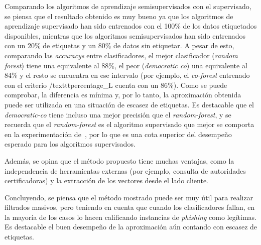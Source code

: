 Comparando los algoritmos de aprendizaje semisupervisados con el supervisado, se piensa que el resultado obtenido es muy bueno ya que los algoritmos de aprendizaje supervisado han sido entrenados con el 100\% de los datos etiquetados disponibles, mientras que los algoritmos semisupervisados han sido entrenados con un 20\% de etiquetas y un 80\% de datos sin etiquetar. A pesar de esto, comparando las \textit{accuracys} entre clasificadores, el mejor clasificador (\textit{random forest}) tiene una equivalente al 88\%, el peor (\textit{democratic co}) una equivalente al 84\% y el resto se encuentra en ese intervalo (por ejemplo, el \textit{co-forest} entrenado con el criterio /texttt{percentage\_L} cuenta con un 86\%). Como se puede comprobar, la diferencia es mínima y, por lo tanto, la aproximación obtenida puede ser utilizada en una situación de escasez de etiquetas. Es destacable que el \textit{democratic-co} tiene incluso una mejor precisión que el \textit{random-forest}, y se recuerda que el \textit{random-forest} es el algoritmo supervisado que mejor se comporta en la experimentación de~\cite{featuresPhishing2018Gupta}, por lo que es una cota superior del desempeño esperado para los algoritmos supervisados.

Además, se opina que el método propuesto tiene muchas ventajas, como la independencia de herramientas externas (por ejemplo, consulta de autoridades certificadoras) y la extracción de los vectores desde el lado cliente.

Concluyendo, se piensa que el método mostrado puede ser muy útil para realizar filtrados masivos, pero teniendo en cuenta que cuando los clasificadores fallan, en la mayoría de los casos lo hacen calificando instancias de \textit{phishing} como legítimas. Es destacable el buen desempeño de la aproximación aún contando con escasez de etiquetas.


